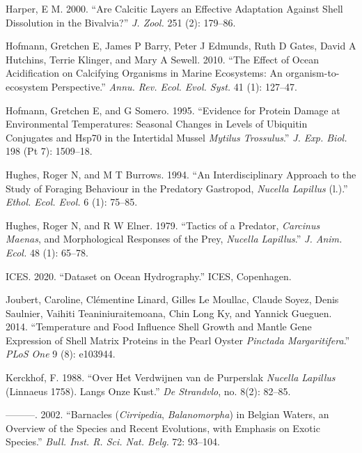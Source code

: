 \documentclass[smallextended]{svjour3}       %
\newlength{\cslhangindent}
\newenvironment{CSLReferences}[2] %
 {%
  \setlength{\parindent}{0pt}
  \ifodd #1 \everypar{\setlength{\hangindent}{\cslhangindent}}\ignorespaces\fi
  \ifnum #2 > 0
  \setlength{\parskip}{#2\baselineskip}
  \fi
 }%
 {}
\begin{document}
\begin{CSLReferences}{1}{0}
\leavevmode{}%
Harper, E M. 2000. {``Are Calcitic Layers an Effective Adaptation
Against Shell Dissolution in the Bivalvia?''} \emph{J. Zool.} 251 (2):
179--86.

\leavevmode{}%
Hofmann, Gretchen E, James P Barry, Peter J Edmunds, Ruth D Gates, David
A Hutchins, Terrie Klinger, and Mary A Sewell. 2010. {``The Effect of
Ocean Acidification on Calcifying Organisms in Marine Ecosystems: An
{organism-to-ecosystem} Perspective.''} \emph{Annu. Rev. Ecol. Evol.
Syst.} 41 (1): 127--47.

\leavevmode{}%
Hofmann, Gretchen E, and G Somero. 1995. {``Evidence for Protein Damage
at Environmental Temperatures: Seasonal Changes in Levels of Ubiquitin
Conjugates and Hsp70 in the Intertidal Mussel \emph{Mytilus
Trossulus}.''} \emph{J. Exp. Biol.} 198 (Pt 7): 1509--18.

\leavevmode{}%
Hughes, Roger N, and M T Burrows. 1994. {``An Interdisciplinary Approach
to the Study of Foraging Behaviour in the Predatory Gastropod,
\emph{Nucella Lapillus} (l.).''} \emph{Ethol. Ecol. Evol.} 6 (1):
75--85.

\leavevmode{}%
Hughes, Roger N, and R W Elner. 1979. {``Tactics of a Predator,
\emph{Carcinus Maenas}, and Morphological Responses of the Prey,
\emph{Nucella Lapillus}.''} \emph{J. Anim. Ecol.} 48 (1): 65--78.

\leavevmode{}%
ICES. 2020. {``Dataset on Ocean Hydrography.''} ICES, Copenhagen.

\leavevmode{}%
Joubert, Caroline, Clémentine Linard, Gilles Le Moullac, Claude Soyez,
Denis Saulnier, Vaihiti Teaniniuraitemoana, Chin Long Ky, and Yannick
Gueguen. 2014. {``Temperature and Food Influence Shell Growth and Mantle
Gene Expression of Shell Matrix Proteins in the Pearl Oyster
\emph{Pinctada Margaritifera}.''} \emph{PLoS One} 9 (8): e103944.

\leavevmode{}%
Kerckhof, F. 1988. {``Over Het Verdwijnen van de Purperslak
\emph{Nucella Lapillus} (Linnaeus 1758). Langs Onze Kust.''} \emph{De
Strandvlo}, no. 8(2): 82--85.

\leavevmode{}%
---------. 2002. {``Barnacles (\emph{Cirripedia}, \emph{Balanomorpha})
in Belgian Waters, an Overview of the Species and Recent Evolutions,
with Emphasis on Exotic Species.''} \emph{Bull. Inst. R. Sci. Nat.
Belg.} 72: 93--104.


\end{CSLReferences}
\end{document}

